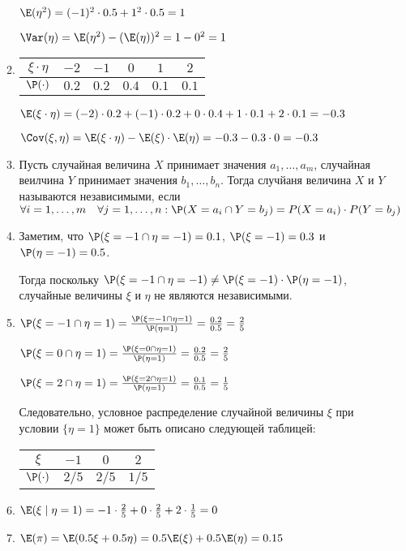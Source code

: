 \begin{enumerate}
\begin{enumerate}
$\E(\eta^2) = (-1)^2 \cdot 0.5 + 1^2 \cdot 0.5 = 1$

$\Var(\eta) = \E(\eta^2)-(\E(\eta))^2 = 1 - 0^2 = 1$

\item \begin{tabular}{cccccc}
\toprule
$\xi \cdot \eta$ & $-2$ & $-1$ & $0$ & $1$ & $2$ \\ \midrule
$\P(\cdot)$ & $0.2$ & $0.2$ & $0.4$ & $0.1$ & $0.1$ \\ \bottomrule
\end{tabular}

$\E(\xi\cdot\eta) = (-2) \cdot 0.2 + (-1) \cdot 0.2 + 0 \cdot 0.4 + 1\cdot 0.1 + 2 \cdot 0.1 = -0.3$

$\Cov(\xi, \eta) = \E(\xi\cdot\eta) - \E(\xi)\cdot\E(\eta) = -0.3 - 0.3 \cdot 0 = -0.3$
\item Пусть случайная величина $X$ принимает значения $a_1, \ldots, a_m$, случайная веилчина $Y$ принимает значения $b_1, \ldots, b_n$. Тогда случйаня величина $X$ и $Y$ называются независимыми, если $\forall i=1, \ldots, m \quad \forall j=1, \ldots, n: \P(X = a_i \cap Y = b_j) = P(X = a_i) \cdot P(Y = b_j)$
\item Заметим, что $\P (\xi = -1 \cap \eta=-1)=0.1$, $\P(\xi=-1)=0.3$ и $\P(\eta=-1)=0.5$.

Тогда поскольку $\P (\xi = -1 \cap \eta=-1) \neq \P(\xi=-1) \cdot \P(\eta=-1)$, случайные величины $\xi$ и $\eta$ не являются независимыми.
\item $\P (\xi = -1 \cap \eta=1) = \frac{\P (\xi = -1 \cap \eta=1)}{\P(\eta=1)} = \frac{0.2}{0.5} = \frac{2}{5}$

$\P (\xi = 0 \cap \eta=1) = \frac{\P (\xi = 0 \cap \eta=1)}{\P(\eta=1)} = \frac{0.2}{0.5} = \frac{2}{5}$

$\P (\xi = 2 \cap \eta=1) = \frac{\P (\xi = 2 \cap \eta=1)}{\P(\eta=1)} = \frac{0.1}{0.5} = \frac{1}{5}$

Следовательно, условное распределение случайной величины $\xi$ при условии $\{\eta=1\}$ может быть описано следующей таблицей:

\begin{tabular}{cccc}
\toprule
$\xi$ & $-1$ & $0$ & $2$ \\ \midrule
$\P(\cdot)$ & $2/5$ & $2/5$ & $1/5$ \\ \bottomrule
\end{tabular}
\item $\E(\xi \mid \eta = 1) = -1 \cdot \frac{2}{5} + 0 \cdot \frac{2}{5} + 2 \cdot \frac{1}{5} = 0$
\item $\E(\pi) = \E(0.5 \xi + 0.5 \eta) = 0.5 \E(\xi) + 0.5 \E(\eta) = 0.15$


\end{enumerate}
\end{enumerate}

